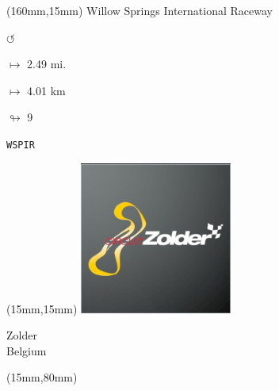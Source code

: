 \begin{textblock*}{40mm}(160mm,15mm)%
Willow Springs International Raceway
\par \Huge$\circlearrowleft$
\Large
\par$\mapsto$ 2.49 mi.
\par$\mapsto$ 4.01 km
\par$\looparrowright$ 9
\par\hfill\tiny\tt WSPIR\\
\end{textblock*}
\null\newpage

\begin{textblock*}{50mm}(15mm,15mm)%
\includegraphics[width=50mm]{LG/2015-05-20_00100.png}
\par Zolder\\ Belgium
\end{textblock*}
\begin{textblock*}{185mm}(15mm,80mm)%
\end{textblock*}
